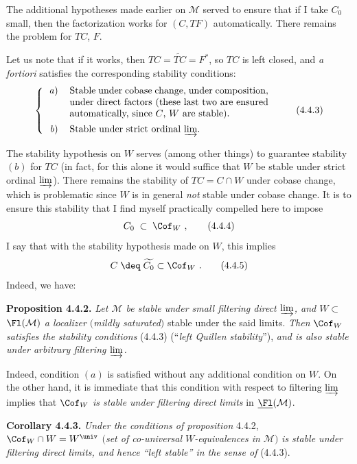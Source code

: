 The additional hypotheses made earlier on $\mathcal{M}$ served to ensure that if I take $C_0$ small, then the factorization works for $(C,TF)$ automatically. There remains the problem for $TC$, $F$.

Let us note that if it works, then $TC=\widetilde{TC}=F^*$, so $TC$ is left closed, and \textit{a fortiori} satisfies the corresponding stability conditions:
\[
\left\{
\begin{tabular}{rp{0.6\textwidth}}
\textit{a}) & Stable under cobase change, under composition, under direct factors (these last two are ensured automatically, since $C$, $W$ are stable).\\[1ex]
\textit{b}) & Stable under strict ordinal $\varinjlim$.
\end{tabular}
\right.
\tag*{(4.4.3)}
\]

The stability hypothesis on $W$ serves (among other things) to guarantee stability $(b)$ for $TC$ (in fact, for this alone it would suffice that $W$ be stable under strict ordinal $\varinjlim$). There remains the stability of $TC=C{\cap}W$ under cobase change, which is problematic since $W$ is in general \textit{not} stable under cobase change. It is to ensure this stability that I find myself practically compelled here to impose
\[
C_0\;\subset\;\Cof_W\ , \tag*{(4.4.4)}
\]
I say that with the stability hypothesis made on $W$, this implies
\[
C\;\deq\;\widetilde{C_0}\subset\Cof_W\ . \tag*{(4.4.5)}
\]
Indeed, we have:

\textbf{Proposition 4.4.2.} \textit{Let $\mathcal{M}$ be stable under small filtering direct $\varinjlim$, and $W\subset$} $\Fl(\mathcal{M})$ \textit{a localizer $($mildly saturated$)$} stable under the said limits. \textit{Then} $\Cof_W$ \textit{satisfies the stability conditions} (4.4.3) (``\textit{left Quillen stability}''), \textit{and is also stable under arbitrary filtering $\varinjlim$.}

Indeed, condition $(a)$ is satisfied without any additional condition on $W$. On the other hand, it is immediate that this condition with respect to filtering $\varinjlim$ implies that $\Cof_W$ \textit{is stable under filtering direct limits} in $\underline{\Fl}(\mathcal{M})$.

\textbf{Corollary 4.4.3.} \textit{Under the conditions of proposition} 4.4.2, $\Cof_W\cap W=W^{\univ}$ $($\textit{set of co-universal $W$-equivalences in $\mathcal{M}$}$)$ \textit{is stable under filtering direct limits, and hence ``left stable'' in the sense of} (4.4.3).

